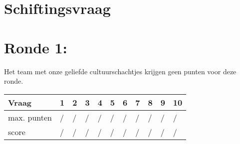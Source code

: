 \section{Schiftingsvraag}
\enspace\hrulefill

\section{Ronde 1:}
\begin{questions}

\question[1] \enspace\hrulefill
\question[1] \enspace\hrulefill
\question[1] \enspace\hrulefill
\question[1] \enspace\hrulefill
\question[1] \enspace\hrulefill
\question[1] \enspace\hrulefill
\question[1] \enspace\hrulefill
\question[1] \enspace\hrulefill
\question[1] \enspace\hrulefill
\question[1] \enspace\hrulefill

\end{questions}
\vspace{3em}
Het team met onze geliefde cultuurschachtjes krijgen geen punten voor deze ronde.
\begin{table}[!b]
\centering
\begin{tabular}{|l|l|l|l|l|l|l|l|l|l|l|}
\hline
Vraag       & 1 & 2 & 3 & 4 & 5 & 6 & 7 & 8 & 9 & 10 \\ \hline
max. punten & / & / & / & / & / & / & / & / & / & /  \\ \hline
score       & / & / & / & / & / & / & / & / & / & /  \\ \hline
\end{tabular}
\end{table}
\newpage
